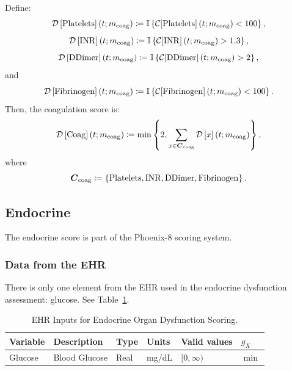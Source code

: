 \documentclass[letterpaper,10pt]{article}
\begin{document}
Define:
\begin{equation}
  \label{eq:coag-component-platelets}
  \DS{Platelets}[\m{coag}]  \coloneqq \mathbb{I}\left\{\CF{Platelets}[\m{coag}] < 100 \right\},
\end{equation}
\begin{equation}
  \label{eq:coag-component-inr}
  \DS{INR}[\m{coag}]        \coloneqq \mathbb{I}\left\{\CF{INR}[\m{coag}] > 1.3\right\},
\end{equation}
\begin{equation}
  \label{eq:coag-component-ddimer}
  \DS{DDimer}[\m{coag}]     \coloneqq \mathbb{I}\left\{\CF{DDimer}[\m{coag}] > 2\right\},
\end{equation}
and
\begin{equation}
  \label{eq:coag-component-fibrinogen}
  \DS{Fibrinogen}[\m{coag}] \coloneqq \mathbb{I}\left\{\CF{Fibrinogen}[\m{coag}] < 100\right\}.
\end{equation}
Then, the coagulation score is:
\begin{equation}
  \label{eq:coag}
  \DS{Coag}[\m{coag}] \coloneqq \min \left\{2, \sum_{x \in \Ccoag} \DS*{x}[\m{coag}] \right\},
\end{equation}
where
\begin{equation}
  \label{eq:coag-component-set}
  \boldsymbol{C}_{\mathrm{coag}} \coloneqq \left\{\mathrm{Platelets}, \mathrm{INR}, \mathrm{DDimer}, \mathrm{Fibrinogen}\right\}.
\end{equation}


\subsection{Endocrine}\label{sec:endo}

The endocrine score is part of the Phoenix-8 scoring system.

\subsubsection{Data from the EHR}\label{sec:endo-ehr}
There is only one element from the EHR used in the endocrine dysfunction
assessment: glucose. See Table~\ref{tab:endo-ehr}.

\begin{table}
  \centering
  \caption{EHR Inputs for Endocrine Organ Dysfunction Scoring.}
  \label{tab:endo-ehr}
  \small
  \begin{tabular}{llllll}
    \toprule
    \textbf{Variable} &
    \textbf{Description} &
    \textbf{Type} &
    \textbf{Units} &
    \textbf{Valid values} &
    \textbf{$g_X$} \\
    \midrule

    \rowcolor{gray!20}
    Glucose &
    Blood Glucose &
    Real &
    mg/dL &
    $[0, \infty)$ &
    $\min$ \\
    \bottomrule
  \end{tabular}
\end{table}
\end{document}

